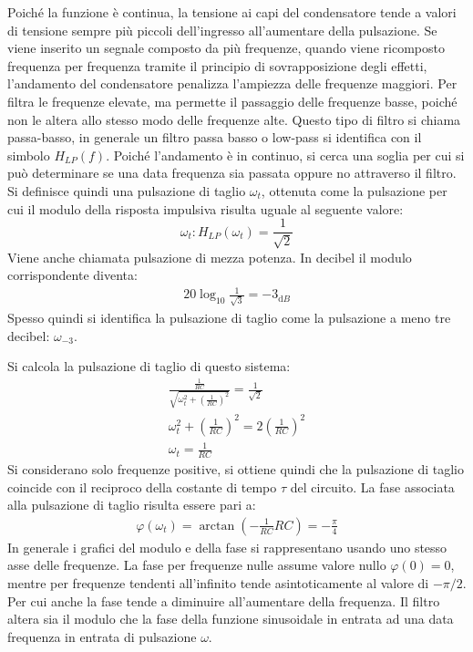 \documentclass{article}
\newcommand{\df}{\mathrm{d}}
\numberwithin{equation}{subsection}
\begin{document}
Poiché la funzione è continua, la tensione ai capi del condensatore tende a valori di tensione sempre più piccoli dell'ingresso all'aumentare della pulsazione. 
Se viene inserito un segnale composto da più frequenze, quando viene ricomposto frequenza per frequenza tramite il principio di sovrapposizione degli effetti, 
l'andamento del condensatore penalizza l'ampiezza delle frequenze maggiori. Per filtra le frequenze elevate, ma permette il passaggio delle frequenze basse, poiché 
non le altera allo stesso modo delle frequenze alte. 
Questo tipo di filtro si chiama passa-basso, in generale un filtro passa basso o low-pass si identifica con il simbolo $H_{LP}(f)$. Poiché l'andamento è in continuo, 
si cerca una soglia per cui si può determinare se una data frequenza sia passata oppure no attraverso il filtro.
Si definisce quindi una pulsazione di taglio $\omega_t$, ottenuta come la pulsazione per cui il modulo della risposta impulsiva risulta uguale al seguente valore:
\begin{equation}
    \omega_t:H_{LP}(\omega_t)=\displaystyle\frac{1}{\sqrt2}
\end{equation}
Viene anche chiamata pulsazione di mezza potenza. In decibel il modulo corrispondente diventa:
\begin{gather*}
    20\log_{10}\displaystyle\frac{1}{\sqrt3}=-3_{\df B}
\end{gather*}
Spesso quindi si identifica la pulsazione di taglio come la pulsazione a meno tre decibel: $\omega_{-3}$. 

Si calcola la pulsazione di taglio di questo sistema:
\begin{gather*}
    \displaystyle\frac{\displaystyle\frac{1}{RC}}{\sqrt{\omega_t^2+\left(\displaystyle\frac{1}{RC}\right)^2}}=\frac{1}{\sqrt2}\\
    \omega_t^2+\left(\displaystyle\frac{1}{RC}\right)^2=2\left(\frac{1}{RC}\right)^2\\
    \omega_t=\displaystyle\frac{1}{RC}
\end{gather*}
Si considerano solo frequenze positive, si ottiene quindi che la pulsazione di taglio coincide con il reciproco della costante di tempo $\tau$ del circuito. 
La fase associata alla pulsazione di taglio risulta essere pari a:
\begin{gather*}
    \varphi(\omega_t)=\arctan\left(-\displaystyle\frac{1}{RC}RC\right)=-\frac{\pi}{4}
\end{gather*}
In generale i grafici del modulo e della fase si rappresentano usando uno stesso asse delle frequenze. La fase per frequenze nulle assume valore nullo $\varphi(0)=0$, 
mentre per frequenze tendenti all'infinito tende asintoticamente al valore di $-\pi/2$. Per cui anche la fase tende a diminuire all'aumentare della frequenza. 
Il filtro altera sia il modulo che la fase della funzione sinusoidale in entrata ad una data frequenza in entrata di pulsazione $\omega$. 
\end{document}
